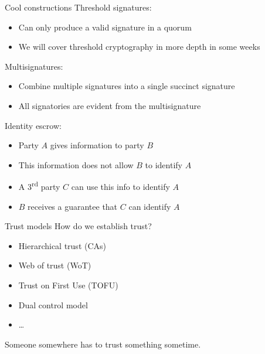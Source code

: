 \begin{frame}{Cool constructions}
  \pause
  Threshold signatures:
  \begin{itemize}[<+(1)->]
    \item Can only produce a valid signature in a quorum
    \item We will cover threshold cryptography in more depth in some weeks
  \end{itemize}

  \pause
  Multisignatures:
  \begin{itemize}[<+(1)->]
    \item Combine multiple signatures into a single succinct signature
    \item All signatories are evident from the multisignature
  \end{itemize}

  \pause
  Identity escrow:
  \begin{itemize}[<+(1)->]
    \item Party $A$ gives information to party $B$
    \item This information does not allow $B$ to identify $A$
    \item A 3\textsuperscript{rd} party $C$ can use this info to identify $A$
    \item $B$ receives a guarantee that $C$ can identify $A$
  \end{itemize}
\end{frame}

\begin{frame}{Trust models}
  How do we establish trust?
  \begin{itemize}[<+(1)->]
    \item Hierarchical trust (CAs)
    \item Web of trust (WoT)
    \item Trust on First Use (TOFU)
    \item Dual control model
    \item \dots
  \end{itemize}

  \pause
  Someone somewhere has to trust something sometime.
\end{frame}

